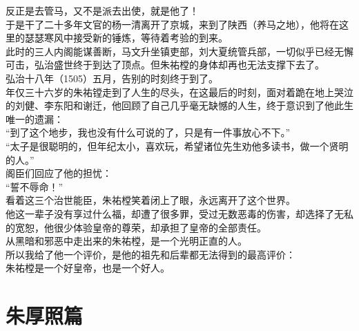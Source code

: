 \begin{multicols}{\theparacolNo}
反正是去管马，又不是派去出使，就是他了！\\

于是干了二十多年文官的杨一清离开了京城，来到了陕西（养马之地），他将在这里的瑟瑟寒风中接受新的锤炼，等待着考验的到来。\\

此时的三人内阁能谋善断，马文升坐镇吏部，刘大夏统管兵部，一切似乎已经无懈可击，弘治盛世终于到达了顶点。但朱祐樘的身体却再也无法支撑下去了。\\

弘治十八年（1505）五月，告别的时刻终于到了。\\

年仅三十六岁的朱祐镗走到了人生的尽头，在这最后的时刻，面对着跪在地上哭泣的刘健、李东阳和谢迁，他回顾了自己几乎毫无缺憾的人生，终于意识到了他此生唯一的遗漏：\\

“到了这个地步，我也没有什么可说的了，只是有一件事放心不下。”\\

“太子是很聪明的，但年纪太小，喜欢玩，希望诸位先生劝他多读书，做一个贤明的人。”\\

阁臣们回应了他的担忧：\\

“誓不辱命！”\\

看着这三个治世能臣，朱祐樘笑着闭上了眼，永远离开了这个世界。\\

他这一辈子没有享过什么福，却遭了很多罪，受过无数恶毒的伤害，却选择了无私的宽恕，他很少体验皇帝的尊荣，却承担了皇帝的全部责任。\\

从黑暗和邪恶中走出来的朱祐樘，是一个光明正直的人。\\

所以我给了他一个评价，是他的祖先和后辈都无法得到的最高评价：\\

朱祐樘是一个好皇帝，也是一个好人。\\
\ifnum{}
	\end{multicols}
\fi
\newpage
\chapter*{朱厚照篇}

